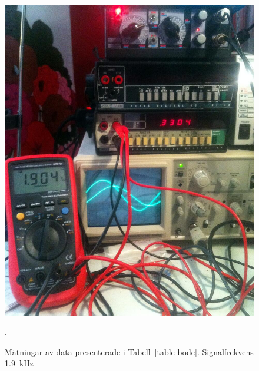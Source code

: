 \begin{figure}
  \centering
  \includegraphics[width=\linewidth]{img/bode_1900Hz.jpg}
  \caption[] {Mätningar av data presenterade i Tabell~\ref{table-bode}.
              Signalfrekvens \SI{1.9}{\kHz}}.
  \label{fig:bode-foto-1900}
\end{figure}

